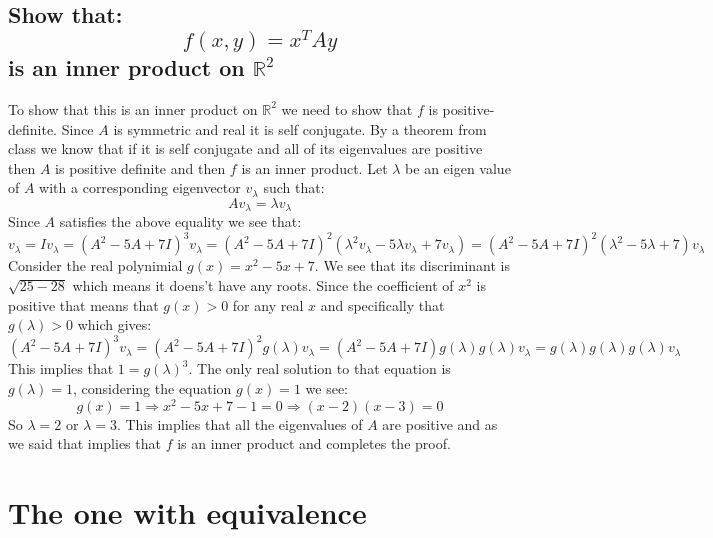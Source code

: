 \documentclass[11pt,a4paper]{article}
\theoremstyle{plain}
\newcommand{\R}{\mathbb{R}}
\begin{document}
	\subsection{Show that:
	\[
		f(x,y) = x^{T} A y
	\]
	is an inner product on $\R^2$}
	To show that this is an inner product on $\R^2$ we need to show that $f$
	is positive-definite. Since $A$ is symmetric and real it is self conjugate.
	By a theorem from class we know that if it is self conjugate and all of 
	its eigenvalues are positive then $A$ is positive definite and then
	$f$ is an inner product. Let $\lambda$ be an eigen value of $A$ with
	a corresponding eigenvector $v_\lambda$ such that:
	\[
		Av_{\lambda} = \lambda v_{\lambda}
	\]
	Since $A$ satisfies the above equality we see that:
	\[
		v_{\lambda} = Iv_{\lambda} = (A^2-5A+7I)^3 v_{\lambda} = 
		(A^2-5A+7I)^2 
		(\lambda^2 v_{\lambda} - 5\lambda v_{\lambda} + 7 v_{\lambda}) = 
		(A^2-5A+7I)^2 (\lambda^2 - 5\lambda + 7)v_{\lambda}
	\]
	Consider the real polynimial $g(x) = x^2-5x+7$. We see that its discriminant
	is $\sqrt{25 - 28}$ which means it doens't have any roots. Since the
	coefficient of $x^2$ is positive that means that $g(x) > 0$ for any
	real $x$ and specifically that $g(\lambda) > 0$ which gives:
	\[
		(A^2-5A+7I)^3 v_{\lambda} = 
		(A^2-5A+7I)^2 g(\lambda) v_{\lambda} = 
		(A^2-5A+7I)   g(\lambda)g(\lambda) v_{\lambda} = 
					  g(\lambda)g(\lambda)g(\lambda) v_{\lambda}
	\]
	This implies that $1 = g(\lambda)^3$. The only real solution to that
	equation is $g(\lambda) = 1$, considering the equation $g(x) = 1$
	we see:
	\[
		g(x) = 1 \Rightarrow x^2-5x+7 - 1 = 0 \Rightarrow (x-2)(x-3) = 0
	\]
	So $\lambda = 2$ or $\lambda = 3$. This implies that all the eigenvalues
	of $A$ are positive and as we said that implies that $f$ is an inner
	product and completes the proof.
	
	\newpage
	
	\section{The one with equivalence}
\end{document}
